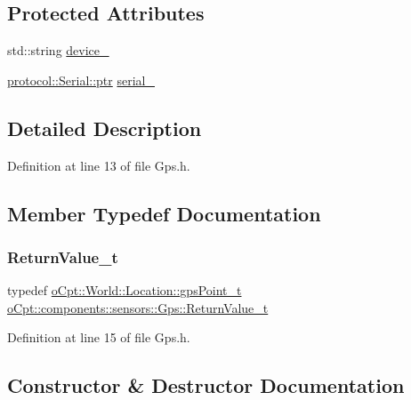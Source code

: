 \subsection*{Protected Attributes}
\begin{DoxyCompactItemize}
\item 
std\+::string \hyperlink{classo_cpt_1_1components_1_1sensors_1_1_gps_a6b8c50dca0776870cedabbb527b2144e}{device\+\_\+}
\item 
\hyperlink{classo_cpt_1_1protocol_1_1_serial_a4c97c6a2456d649974e07a186f634780}{protocol\+::\+Serial\+::ptr} \hyperlink{classo_cpt_1_1components_1_1sensors_1_1_gps_a42ea2d37ec01473e92be6ef3cda6de39}{serial\+\_\+}
\end{DoxyCompactItemize}


\subsection{Detailed Description}


Definition at line 13 of file Gps.\+h.



\subsection{Member Typedef Documentation}
\hypertarget{classo_cpt_1_1components_1_1sensors_1_1_gps_a01613dafbb15790246b00223f850a962}{}\label{classo_cpt_1_1components_1_1sensors_1_1_gps_a01613dafbb15790246b00223f850a962} 
\subsubsection{\texorpdfstring{Return\+Value\+\_\+t}{ReturnValue\_t}}
{\footnotesize\ttfamily typedef \hyperlink{classo_cpt_1_1_world_1_1_location_a3aa5e31e2888b4da40ad534b99473888}{o\+Cpt\+::\+World\+::\+Location\+::gps\+Point\+\_\+t} \hyperlink{classo_cpt_1_1components_1_1sensors_1_1_gps_a01613dafbb15790246b00223f850a962}{o\+Cpt\+::components\+::sensors\+::\+Gps\+::\+Return\+Value\+\_\+t}}



Definition at line 15 of file Gps.\+h.



\subsection{Constructor \& Destructor Documentation}
\hypertarget{classo_cpt_1_1components_1_1sensors_1_1_gps_a24c1c7c95c57f9c5fa47d0640ba5d6dc}{}\label{classo_cpt_1_1components_1_1sensors_1_1_gps_a24c1c7c95c57f9c5fa47d0640ba5d6dc} 

